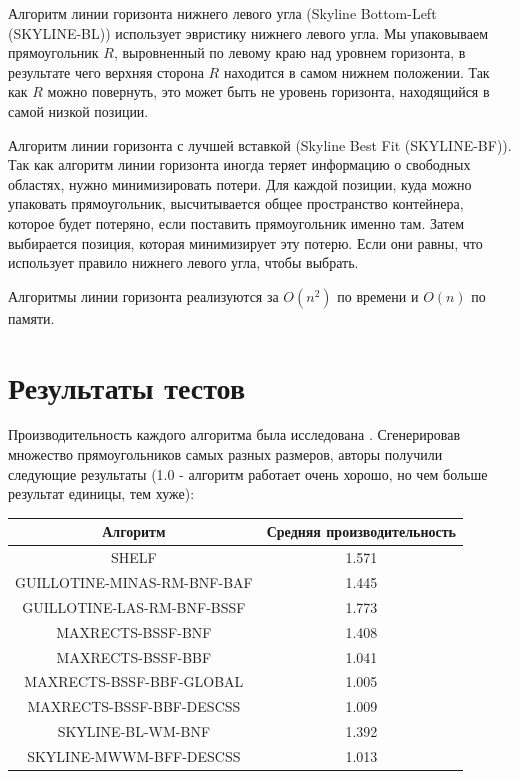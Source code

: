 \documentclass[a4paper,12pt]{report}
\theoremstyle{remark}
\begin{document}
Алгоритм линии горизонта нижнего левого угла (Skyline Bottom-Left (SKYLINE-BL)) использует эвристику нижнего левого угла. Мы упаковываем прямоугольник $R$, выровненный по левому краю над уровнем горизонта, в результате чего верхняя сторона $R$ находится в самом нижнем положении. Так как $R$ можно повернуть, это может быть не уровень горизонта, находящийся в самой низкой позиции.

Алгоритм линии горизонта с лучшей вставкой (Skyline Best Fit (SKYLINE-BF)). Так как алгоритм линии горизонта иногда теряет информацию о свободных областях, нужно минимизировать потери. Для каждой позиции, куда можно упаковать прямоугольник, высчитывается общее пространство контейнера, которое будет потеряно, если поставить прямоугольник именно там. Затем выбирается позиция, которая минимизирует эту потерю. Если они равны, что использует правило нижнего левого угла, чтобы выбрать.

Алгоритмы линии горизонта реализуются за $O(n^2)$ по времени и $O(n)$ по памяти.

\section{Результаты тестов}

Производительность каждого алгоритма была исследована \citep{Jylanki}. Сгенерировав множество прямоугольников самых разных размеров, авторы получили следующие результаты (1.0 - алгоритм работает очень хорошо, но чем больше результат единицы, тем хуже): 

\begin{center}
\begin{tabular}{ c|c }
 Алгоритм & Средняя производительность \\
 \hline
  SHELF & 1.571 \\ 
  GUILLOTINE-MINAS-RM-BNF-BAF & 1.445 \\ 
  GUILLOTINE-LAS-RM-BNF-BSSF & 1.773 \\
  MAXRECTS-BSSF-BNF & 1.408 \\
  MAXRECTS-BSSF-BBF & 1.041 \\
  MAXRECTS-BSSF-BBF-GLOBAL & 1.005 \\
  MAXRECTS-BSSF-BBF-DESCSS & 1.009 \\
  SKYLINE-BL-WM-BNF & 1.392 \\
  SKYLINE-MWWM-BFF-DESCSS & 1.013 \\
\end{tabular}
\end{center}
\end{document}
